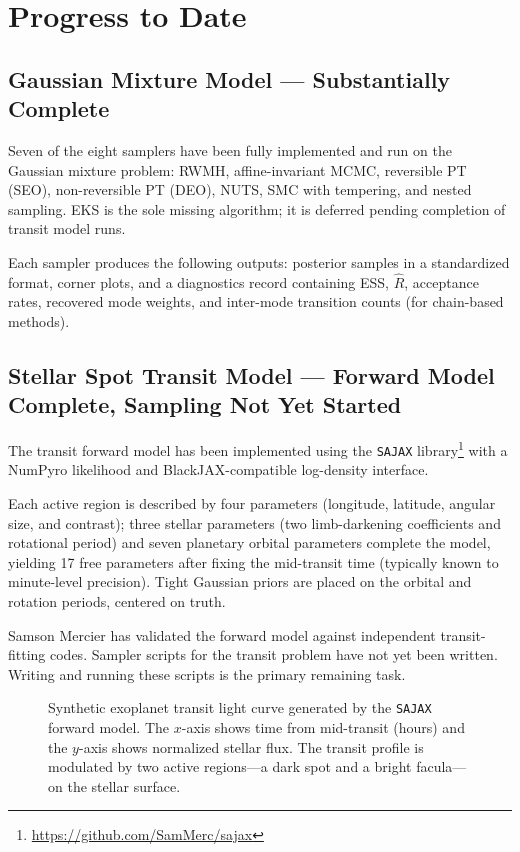\documentclass{article}
\begin{document}
\section{Progress to Date}

\subsection{Gaussian Mixture Model --- Substantially Complete}

Seven of the eight samplers have been fully implemented and run on the Gaussian
mixture problem: RWMH, affine-invariant MCMC, reversible PT (SEO),
non-reversible PT (DEO), NUTS, SMC with tempering, and nested sampling. EKS is
the sole missing algorithm; it is deferred pending completion of transit model
runs.

Each sampler produces the following outputs: posterior samples in a
standardized format, corner plots, and a diagnostics record containing ESS,
$\hat{R}$, acceptance rates, recovered mode weights, and inter-mode transition
counts (for chain-based methods).

\subsection{Stellar Spot Transit Model --- Forward Model Complete, Sampling Not Yet Started}

The transit forward model has been implemented using the \texttt{SAJAX} library\footnote{\url{https://github.com/SamMerc/sajax}}
with a NumPyro likelihood and BlackJAX-compatible log-density interface.

Each active region is described by four parameters (longitude, latitude, angular size, and contrast); three stellar parameters (two limb-darkening coefficients and rotational period) and seven planetary orbital parameters complete the model, yielding 17 free parameters after fixing the mid-transit time (typically known to minute-level precision). Tight Gaussian priors are placed on the orbital and rotation periods, centered on truth.

Samson Mercier has validated the forward model against independent transit-fitting codes. Sampler scripts for the transit problem have not yet been written. Writing and running these scripts is the primary remaining task.

\begin{figure}[h]
\centering
{}
\caption{Synthetic exoplanet transit light curve generated by the \texttt{SAJAX} forward
  model. The $x$-axis shows time from mid-transit (hours) and the $y$-axis shows
  normalized stellar flux. The transit profile is modulated by two active regions---a
  dark spot and a bright facula---on the stellar surface.}
\label{fig:lightcurve}
\end{figure}
\end{document}

